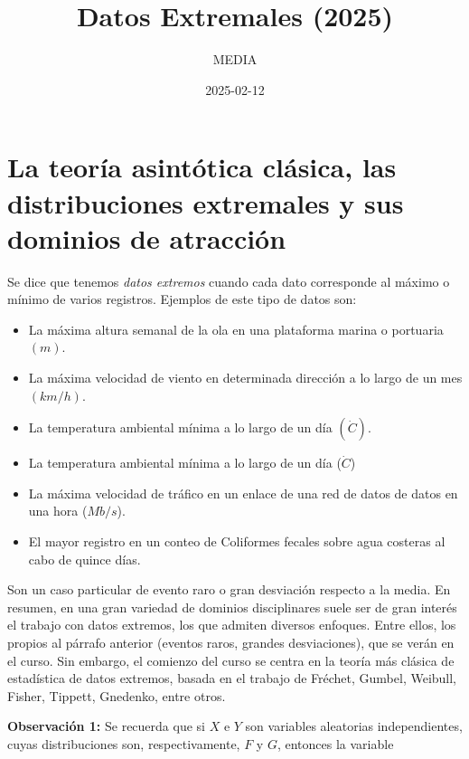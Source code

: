 \documentclass[
]{book}
\title{Datos Extremales (2025)}
\author{MEDIA}
\date{2025-02-12}
\providecommand{\tightlist}{%
  \setlength{\itemsep}{0pt}\setlength{\parskip}{0pt}}
\theoremstyle{definition}
\theoremstyle{definition}
\theoremstyle{definition}
\theoremstyle{definition}
\theoremstyle{remark}
\begin{document}
\maketitle

{
\setcounter{tocdepth}{1}
\tableofcontents
}
\chapter{La teoría asintótica clásica, las distribuciones extremales y sus dominios de atracción}\label{la-teoruxeda-asintuxf3tica-cluxe1sica-las-distribuciones-extremales-y-sus-dominios-de-atracciuxf3n}

Se dice que tenemos \emph{datos extremos} cuando cada
dato corresponde al máximo o mínimo de varios
registros. Ejemplos de este tipo de datos son:

\begin{itemize}
\tightlist
\item
  La máxima altura semanal de la ola en una
  plataforma marina o portuaria \((m)\).
\item
  La máxima velocidad de viento en determinada
  dirección a lo largo de un mes \((km/h)\).
\item
  La temperatura ambiental mínima a lo largo de
  un día \((\dot{C})\).
\item
  La temperatura ambiental mínima a lo largo de
  un día (\(\dot{C}\))
\item
  La máxima velocidad de tráfico en un enlace de
  una red de datos de datos en una hora (\(Mb/s\)).
\item
  El mayor registro en un conteo de Coliformes
  fecales sobre agua costeras al cabo de quince días.
\end{itemize}

Son un caso particular de evento raro o gran
desviación respecto a la media.
En resumen, en una gran variedad de dominios
disciplinares suele ser de gran interés el trabajo
con datos extremos, los que admiten diversos
enfoques. Entre ellos, los propios al párrafo
anterior (eventos raros, grandes desviaciones), que
se verán en el curso.
Sin embargo, el comienzo del curso se centra en la
teoría más clásica de estadística de datos extremos,
basada en el trabajo de Fréchet, Gumbel, Weibull,
Fisher, Tippett, Gnedenko, entre otros.

\textbf{Observación 1:} Se recuerda que si \(X\) e \(Y\) son variables aleatorias independientes, cuyas
distribuciones son, respectivamente, \(F\) y \(G\),
entonces la variable
\end{document}

